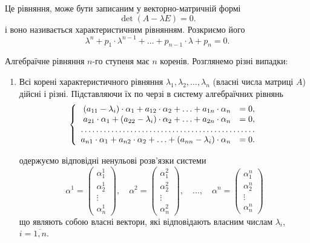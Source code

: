 Це рівняння, може бути записаним у векторно-матричній формі
\begin{equation*}
	\det(A - \lambda E) = 0.
\end{equation*}
і воно називається характеристичним рівнянням. Розкриємо його
\begin{equation*}
	\lambda^n + p_1 \cdot \lambda^{n - 1} + \ldots + p_{n - 1} \cdot \lambda + p_n = 0.
\end{equation*}

Алгебраїчне рівняння $n$-го ступеня має $n$ коренів. Розглянемо різні випадки:
\begin{enumerate}
\item Всі корені характеристичного рівняння $\lambda_1, \lambda_2, \ldots, \lambda_n$ (власні числа матриці $A$) дійсні і різні. Підставляючи їх по черзі в систему алгебраїчних рівнянь
\begin{equation*}
	\left\{
		\begin{array}{rl}
			(a_{11} - \lambda_i) \cdot \alpha_1 + a_{12} \cdot \alpha_2 + \ldots + a_{1n} \cdot \alpha_n &= 0, \\
			a_{21} \cdot \alpha_1 + (a_{22} - \lambda_i) \cdot \alpha_2 + \ldots + a_{2n} \cdot \alpha_n &= 0, \\
			\hdotsfor{2} \\
			a_{n1} \cdot \alpha_1 + a_{n2} \cdot \alpha_2 + \ldots + (a_{nn} - \lambda_i) \cdot \alpha_n &= 0.
		\end{array}
	\right.
\end{equation*}

одержуємо відповідні ненульові розв’язки системи
\begin{equation*}
	\alpha^1 = \begin{pmatrix} \alpha_1^1 \\ \alpha_2^1 \\ \vdots \\ \alpha_n^1 \end{pmatrix}, \quad
	\alpha^2 = \begin{pmatrix} \alpha_1^2 \\ \alpha_2^2 \\ \vdots \\ \alpha_n^2 \end{pmatrix}, \quad
	\ldots, \quad
	\alpha^n = \begin{pmatrix} \alpha_1^n \\ \alpha_2^n \\ \vdots \\ \alpha_n^n \end{pmatrix}
\end{equation*}
що являють собою власні вектори, які відповідають власним числам $\lambda_i$, $i = \overline{1, n}$. \\


\end{enumerate}
